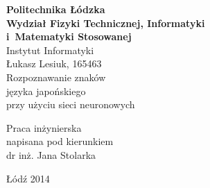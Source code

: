 \begin{titlepage}
\begin{center}
\textbf{{\large Politechnika Łódzka}\\}
\vspace{\medskipamount}
\textbf{\large Wydział Fizyki Technicznej, Informatyki\\i~Matematyki Stosowanej}
\vspace{\medskipamount}\\
{\large {Instytut Informatyki}}\\
\vspace{2.5cm}
{\Large {Łukasz Lesiuk, 165463\\}}
\vspace{2cm}
{\huge{ Rozpoznawanie znaków\\ języka japońskiego\\ przy użyciu sieci neuronowych\\}}
\end{center}
\vspace{3cm}
\hfill
\begin{minipage}{.55\columnwidth}
Praca inżynierska\\
napisana pod kierunkiem\\
dr inż. Jana Stolarka
\end{minipage}
\vfill
\begin{center}
Łódź 2014
\end{center}
\end{titlepage}
